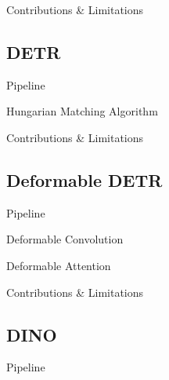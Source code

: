 \documentclass[xcolor=dvipsnames,aspectratio=169]{beamer}
\begin{document}
            \begin{frame}{Contributions \& Limitations}
                
            \end{frame}

        \subsection{DETR}
            \begin{frame}{Pipeline}
                
            \end{frame}

            \begin{frame}{Hungarian Matching Algorithm}
                
            \end{frame}

            \begin{frame}{Contributions \& Limitations}
                
            \end{frame}

        \subsection{Deformable DETR}
            \begin{frame}{Pipeline}
                
            \end{frame}

            \begin{frame}{Deformable Convolution}
                
            \end{frame}

            \begin{frame}{Deformable Attention}
                
            \end{frame}

            \begin{frame}{Contributions \& Limitations}
                
            \end{frame}

        \subsection{DINO}
            \begin{frame}{Pipeline}
                
            \end{frame}
\end{document}
